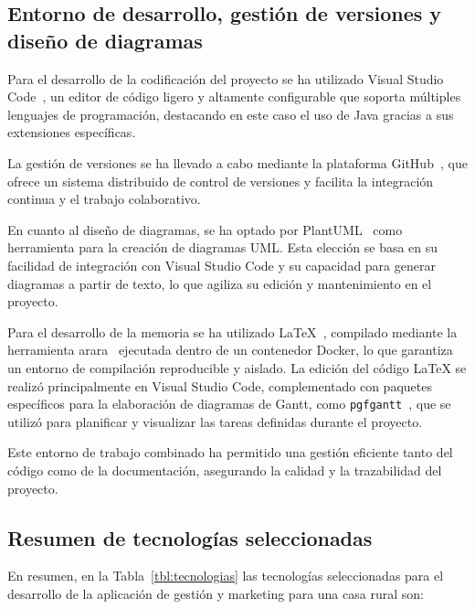 \subsection{Entorno de desarrollo, gestión de versiones y diseño de diagramas}

Para el desarrollo de la codificación del proyecto se ha utilizado Visual Studio Code~\cite{vscode}, un editor de código ligero y altamente configurable que soporta múltiples lenguajes de programación, destacando en este caso el uso de Java gracias a sus extensiones específicas.

La gestión de versiones se ha llevado a cabo mediante la plataforma GitHub~\cite{github}, que ofrece un sistema distribuido de control de versiones y facilita la integración continua y el trabajo colaborativo.

En cuanto al diseño de diagramas, se ha optado por PlantUML~\cite{plantuml} como herramienta para la creación de diagramas UML. Esta elección se basa en su facilidad de integración con Visual Studio Code y su capacidad para generar diagramas a partir de texto, lo que agiliza su edición y mantenimiento en el proyecto.

Para el desarrollo de la memoria se ha utilizado LaTeX~\cite{latex}, compilado mediante la herramienta arara~\cite{arara} ejecutada dentro de un contenedor Docker, lo que garantiza un entorno de compilación reproducible y aislado. La edición del código LaTeX se realizó principalmente en Visual Studio Code, complementado con paquetes específicos para la elaboración de diagramas de Gantt, como \texttt{pgfgantt}~\cite{pgfgant:website}, que se utilizó para planificar y visualizar las tareas definidas durante el proyecto.

Este entorno de trabajo combinado ha permitido una gestión eficiente tanto del código como de la documentación, asegurando la calidad y la trazabilidad del proyecto.
\subsection{Resumen de tecnologías seleccionadas}
En resumen, en la Tabla~\ref{tbl:tecnologias} las tecnologías seleccionadas para el desarrollo de la aplicación de gestión y marketing para una casa rural son:

